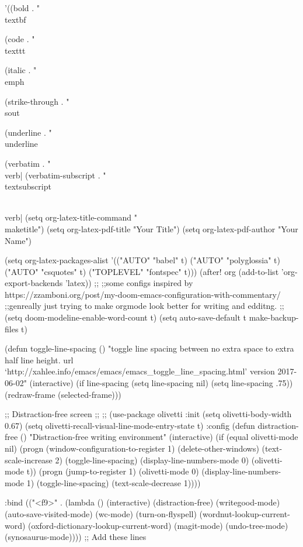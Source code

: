       '((bold . "\\textbf{%
        (code . "\\texttt{%
        (italic . "\\emph{%
        (strike-through . "\\sout{%
        (underline . "\\underline{%
        (verbatim . "\\verb|%s|")
        (verbatim-subscript . "\\textsubscript{\\verb|%s|}")))
(setq org-latex-title-command "\\maketitle")
(setq org-latex-pdf-title "Your Title")
(setq org-latex-pdf-author "Your Name")

(setq org-latex-packages-alist
      '(("AUTO" "babel" t)
        ("AUTO" "polyglossia" t)
        ("AUTO" "csquotes" t)
        ("TOPLEVEL" "fontspec" t)))
(after! org
  (add-to-list 'org-export-backends 'latex))
;;
;;some configs inspired by  https://zzamboni.org/post/my-doom-emacs-configuration-with-commentary/
;;genreally just trying to make orgmode look better for writing and edditng.
;;
(setq doom-modeline-enable-word-count t)
(setq auto-save-default t
      make-backup-files t)

(defun toggle-line-spacing ()
  "toggle line spacing between no extra space to extra half line height.
url `http://xahlee.info/emacs/emacs/emacs_toggle_line_spacing.html'
version 2017-06-02"
  (interactive)
  (if line-spacing
         (setq line-spacing nil)
       (setq line-spacing .75))
     (redraw-frame (selected-frame)))


;; Distraction-free screen
;;
;;
(use-package olivetti
  :init
  (setq olivetti-body-width 0.67)
  (setq olivetti-recall-visual-line-mode-entry-state t)
  :config
  (defun distraction-free ()
    "Distraction-free writing environment"
    (interactive)
    (if (equal olivetti-mode nil)
        (progn
          (window-configuration-to-register 1)
          (delete-other-windows)
          (text-scale-increase 2)
          (toggle-line-spacing)
          (display-line-numbers-mode 0)
          (olivetti-mode t))
      (progn
        (jump-to-register 1)
        (olivetti-mode 0)
        (display-line-numbers-mode 1)
        (toggle-line-spacing)
        (text-scale-decrease 1))))

  :bind
  (("<f9>" . (lambda ()
               (interactive)
               (distraction-free)
               (writegood-mode)
               (auto-save-visited-mode)
               (wc-mode)
               (turn-on-flyspell)
               (wordnut-lookup-current-word)
               (oxford-dictionary-lookup-current-word)
               (magit-mode)
               (undo-tree-mode)
               (synosaurus-mode))))  ;; Add these lines

}}}}}}

